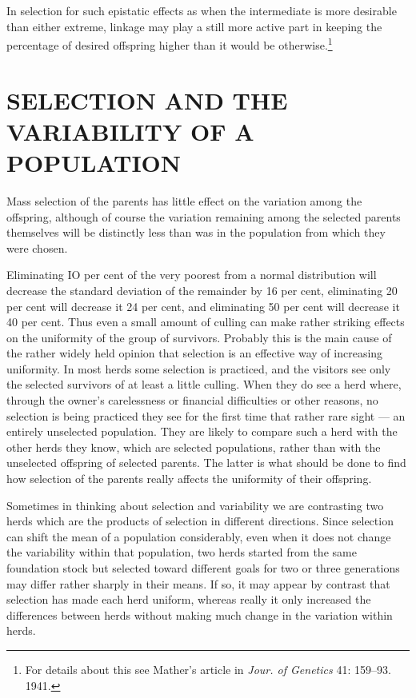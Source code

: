 In selection for such epistatic effects as when the intermediate is
more desirable than either extreme, linkage may play a still more active
part in keeping the percentage of desired offspring higher than it would
be otherwise.\footnote{For details about this see Mather's article in
\textit{Jour. of Genetics} 41: 159--93. 1941.}

\section*{SELECTION AND THE VARIABILITY OF A POPULATION}

Mass selection of the parents has little effect on the variation among
the offspring, although of course the variation remaining among the
selected parents themselves will be distinctly less than was in the population
from which they were chosen.

Eliminating IO per cent of the very poorest from a normal distribution
will decrease the standard deviation of the remainder by 16 per
cent, eliminating 20 per cent will decrease it 24 per cent, and eliminating
50 per cent will decrease it 40 per cent. Thus even a small amount of
culling can make rather striking effects on the uniformity of the group
of survivors. Probably this is the main cause of the rather widely held
opinion that selection is an effective way of increasing uniformity. In
most herds some selection is practiced, and the visitors see only the
selected survivors of at least a little culling. When they do see a herd
where, through the owner's carelessness or financial difficulties or other
reasons, no selection is being practiced they see for the first time that
rather rare sight --- an entirely unselected population. They are likely to
compare such a herd with the other herds they know, which are selected
populations, rather than with the unselected offspring of selected parents.
The latter is what should be done to find how selection of the
parents really affects the uniformity of their offspring.

Sometimes in thinking about selection and variability we are contrasting
two herds which are the products of selection in different directions.
Since selection can shift the mean of a population considerably,
even when it does not change the variability within that population,
two herds started from the same foundation stock but selected toward
different goals for two or three generations may differ rather sharply in
their means. If so, it may appear by contrast that selection has made
each herd uniform, whereas really it only increased the differences
between herds without making much change in the variation within
herds.

